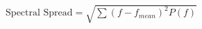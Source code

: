 \documentclass[preview]{standalone}
\begin{document}
\begin{align*}
\text{Spectral Spread} = \sqrt{\sum (f - f_{mean})^2 P(f)}
\end{align*}
\end{document}
